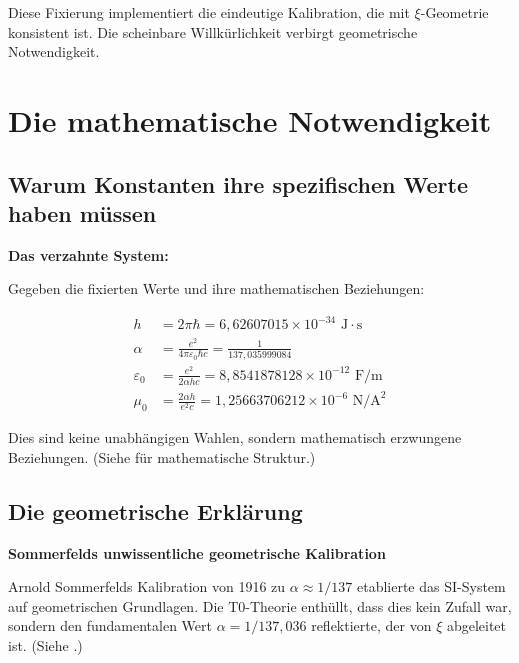 	\begin{insight}
		Diese Fixierung implementiert die eindeutige Kalibration, die mit $\xi$-Geometrie konsistent ist. Die scheinbare Willkürlichkeit verbirgt geometrische Notwendigkeit.
	\end{insight}
	
	\section{Die mathematische Notwendigkeit}
	
	\subsection{Warum Konstanten ihre spezifischen Werte haben müssen}
	
	\begin{derivation}
		\textbf{Das verzahnte System:}
		
		Gegeben die fixierten Werte und ihre mathematischen Beziehungen:
		
		\begin{align}
			h &= 2\pi\hbar = 6{,}62607015 \times 10^{-34} \text{ J}\cdot\text{s} \\
			\alpha &= \frac{e^2}{4\pi\varepsilon_0\hbar c} = \frac{1}{137{,}035999084} \\
			\varepsilon_0 &= \frac{e^2}{2\alpha h c} = 8{,}8541878128 \times 10^{-12} \text{ F/m} \\
			\mu_0 &= \frac{2\alpha h}{e^2 c} = 1{,}25663706212 \times 10^{-6} \text{ N/A}^2
		\end{align}
		
		Dies sind keine unabhängigen Wahlen, sondern mathematisch erzwungene Beziehungen. (Siehe \cite{Mathematische_struktur_De} für mathematische Struktur.)
	\end{derivation}
	
	\subsection{Die geometrische Erklärung}
	
	\begin{historical}
		\textbf{Sommerfelds unwissentliche geometrische Kalibration}
		
		Arnold Sommerfelds Kalibration von 1916 zu $\alpha \approx 1/137$ etablierte das SI-System auf geometrischen Grundlagen. Die T0-Theorie enthüllt, dass dies kein Zufall war, sondern den fundamentalen Wert $\alpha = 1/137{,}036$ reflektierte, der von $\xi$ abgeleitet ist. (Siehe \cite{137_De}.)
	\end{historical}
	
